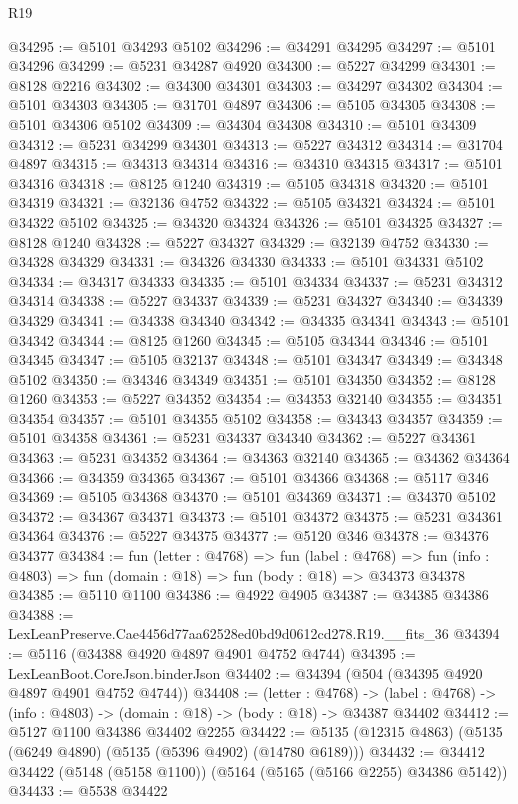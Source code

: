 \begin{lexlean}{R19}
\begin{coremodule}
{{{{{{{{{{{@34295 := @5101 @34293 @5102
@34296 := @34291 @34295
@34297 := @5101 @34296
@34299 := @5231 @34287 @4920
@34300 := @5227 @34299
@34301 := @8128 @2216
@34302 := @34300 @34301
@34303 := @34297 @34302
@34304 := @5101 @34303
@34305 := @31701 @4897
@34306 := @5105 @34305
@34308 := @5101 @34306 @5102
@34309 := @34304 @34308
@34310 := @5101 @34309
@34312 := @5231 @34299 @34301
@34313 := @5227 @34312
@34314 := @31704 @4897
@34315 := @34313 @34314
@34316 := @34310 @34315
@34317 := @5101 @34316
@34318 := @8125 @1240
@34319 := @5105 @34318
@34320 := @5101 @34319
@34321 := @32136 @4752
@34322 := @5105 @34321
@34324 := @5101 @34322 @5102
@34325 := @34320 @34324
@34326 := @5101 @34325
@34327 := @8128 @1240
@34328 := @5227 @34327
@34329 := @32139 @4752
@34330 := @34328 @34329
@34331 := @34326 @34330
@34333 := @5101 @34331 @5102
@34334 := @34317 @34333
@34335 := @5101 @34334
@34337 := @5231 @34312 @34314
@34338 := @5227 @34337
@34339 := @5231 @34327
@34340 := @34339 @34329
@34341 := @34338 @34340
@34342 := @34335 @34341
@34343 := @5101 @34342
@34344 := @8125 @1260
@34345 := @5105 @34344
@34346 := @5101 @34345
@34347 := @5105 @32137
@34348 := @5101 @34347
@34349 := @34348 @5102
@34350 := @34346 @34349
@34351 := @5101 @34350
@34352 := @8128 @1260
@34353 := @5227 @34352
@34354 := @34353 @32140
@34355 := @34351 @34354
@34357 := @5101 @34355 @5102
@34358 := @34343 @34357
@34359 := @5101 @34358
@34361 := @5231 @34337 @34340
@34362 := @5227 @34361
@34363 := @5231 @34352
@34364 := @34363 @32140
@34365 := @34362 @34364
@34366 := @34359 @34365
@34367 := @5101 @34366
@34368 := @5117 @346
@34369 := @5105 @34368
@34370 := @5101 @34369
@34371 := @34370 @5102
@34372 := @34367 @34371
@34373 := @5101 @34372
@34375 := @5231 @34361 @34364
@34376 := @5227 @34375
@34377 := @5120 @346
@34378 := @34376 @34377
@34384 := fun (letter : @4768) =>
  fun (label : @4768) =>
  fun (info : @4803) => fun (domain : @18) => fun (body : @18) => @34373 @34378
@34385 := @5110 @1100
@34386 := @4922 @4905
@34387 := @34385 @34386
@34388 := LexLeanPreserve.Cae4456d77aa62528ed0bd9d0612cd278.R19.__fits_36
@34394 := @5116 (@34388 @4920 @4897 @4901 @4752 @4744)
@34395 := LexLeanBoot.CoreJson.binderJson
@34402 := @34394 (@504 (@34395 @4920 @4897 @4901 @4752 @4744))
@34408 := (letter : @4768) ->
  (label : @4768) -> (info : @4803) -> (domain : @18) -> (body : @18) -> @34387 @34402
@34412 := @5127 @1100 @34386 @34402 @2255
@34422 := @5135 (@12315 @4863) (@5135 (@6249 @4890) (@5135 (@5396 @4902) (@14780 @6189)))
@34432 := @34412 @34422 (@5148 (@5158 @1100)) (@5164 (@5165 (@5166 @2255) @34386 @5142))
@34433 := @5538 @34422
}}}}}}}}}}}
\end{coremodule}
\end{lexlean}
